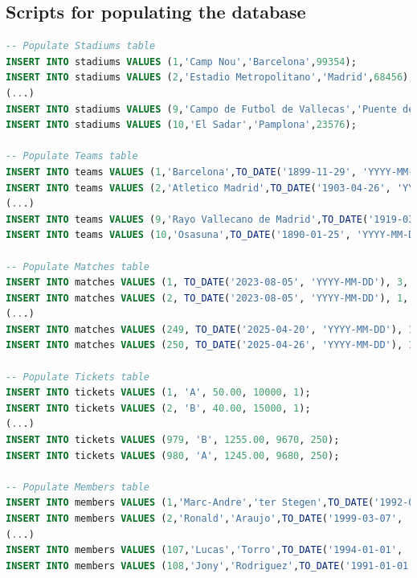 \documentclass[11pt]{article}
\begin{document}
\subsection{Scripts for populating the database}
\begin{lstlisting}[language=SQL, caption=\small Scripts populating the database (\texttt{DBTableInsertion.sql} file)]
-- Populate Stadiums table
INSERT INTO stadiums VALUES (1,'Camp Nou','Barcelona',99354);
INSERT INTO stadiums VALUES (2,'Estadio Metropolitano','Madrid',68456);
(...)
INSERT INTO stadiums VALUES (9,'Campo de Futbol de Vallecas','Puente de Vallecas',14708);
INSERT INTO stadiums VALUES (10,'El Sadar','Pamplona',23576);

-- Populate Teams table
INSERT INTO teams VALUES (1,'Barcelona',TO_DATE('1899-11-29', 'YYYY-MM-DD'),1,'Xavier Hernandez Creus');
INSERT INTO teams VALUES (2,'Atletico Madrid',TO_DATE('1903-04-26', 'YYYY-MM-DD'),2,'Diego Simeone');
(...)
INSERT INTO teams VALUES (9,'Rayo Vallecano de Madrid',TO_DATE('1919-03-18', 'YYYY-MM-DD'),9,'Andoni Iraola');
INSERT INTO teams VALUES (10,'Osasuna',TO_DATE('1890-01-25', 'YYYY-MM-DD'),10,'Jagoba Arrasate');

-- Populate Matches table
INSERT INTO matches VALUES (1, TO_DATE('2023-08-05', 'YYYY-MM-DD'), 3, 2, 'Antonio Mateu Lahoz', 1, 1, 2, 1);
INSERT INTO matches VALUES (2, TO_DATE('2023-08-05', 'YYYY-MM-DD'), 1, 0, 'Carlos Del Cerro Grande', 1, 3, 4, 3);
(...)
INSERT INTO matches VALUES (249, TO_DATE('2025-04-20', 'YYYY-MM-DD'), 1, 0, 'Carlos Del Cerro Grande', 3, 6, 1, 6);
INSERT INTO matches VALUES (250, TO_DATE('2025-04-26', 'YYYY-MM-DD'), 1, 1, 'Aliyar Aghayev', 4, 7, 10, 7);

-- Populate Tickets table
INSERT INTO tickets VALUES (1, 'A', 50.00, 10000, 1);
INSERT INTO tickets VALUES (2, 'B', 40.00, 15000, 1);
(...)
INSERT INTO tickets VALUES (979, 'B', 1255.00, 9670, 250);
INSERT INTO tickets VALUES (980, 'A', 1245.00, 9680, 250);

-- Populate Members table
INSERT INTO members VALUES (1,'Marc-Andre','ter Stegen',TO_DATE('1992-04-30', 'YYYY-MM-DD'),8900.99,'German',1);
INSERT INTO members VALUES (2,'Ronald','Araujo',TO_DATE('1999-03-07', 'YYYY-MM-DD'),7858.09,'Uruguayan',1);
(...)
INSERT INTO members VALUES (107,'Lucas','Torro',TO_DATE('1994-01-01', 'YYYY-MM-DD'),9876.00,'Spanish',10);
INSERT INTO members VALUES (108,'Jony','Rodriguez',TO_DATE('1991-01-01', 'YYYY-MM-DD'),9876.00,'Spanish',10);
\end{lstlisting}
\vspace{2em}
\end{document}
